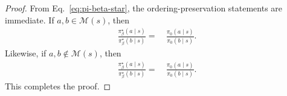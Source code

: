 \begin{proof}
From Eq.~\eqref{eq:pi-beta-star}, the ordering-preservation statements are immediate. If $a,b\in \mathcal M(s)$, then
\begin{align*}
\frac{\pi_\beta^\star(a\mid s)}{\pi_\beta^\star(b\mid s)}
= &~ \frac{\pi_0(a\mid s)}{\pi_0(b\mid s)}.
\end{align*}
Likewise, if $a,b\notin \mathcal M(s)$, then
\begin{align*}
\frac{\pi_\beta^\star(a\mid s)}{\pi_\beta^\star(b\mid s)}
= &~ \frac{\pi_0(a\mid s)}{\pi_0(b\mid s)}.
\end{align*}
This completes the proof.
\end{proof}
